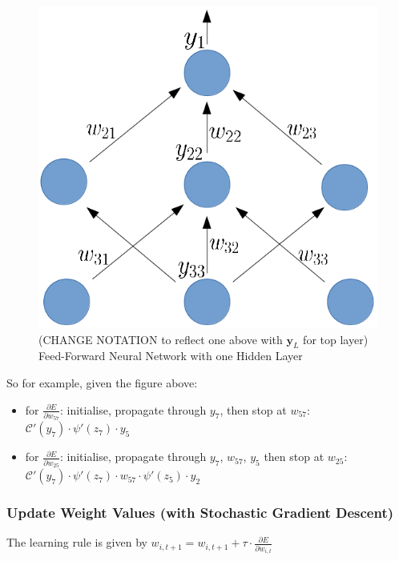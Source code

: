 \documentclass[a4paper,11pt]{article}
\begin{document}
\begin{figure}[h!]
	\centering
	\includegraphics[scale=0.28]{images/gradient_propagates.png}
	\caption{(CHANGE NOTATION to reflect one above with $\textbf{y}_L$ for top layer) Feed-Forward Neural Network with one Hidden Layer}
\end{figure}

So for example, given the figure above:
\begin{itemize}
\renewcommand\labelitemi{--}
\item for $\frac{\partial{E}}{\partial{w_{57}}}$: initialise, propagate through $y_{7}$, then stop at $w_{57}$:
 $ \mathcal{C}'(y_{7}) \cdot \psi'(z_7) \cdot y_5$ 
\item for $\frac{\partial{E}}{\partial{w_{25}}}$: initialise, propagate through $y_{7}$, $w_{57}$, $y_{5}$ then stop at $w_{25}$:
 $\mathcal{C}'(y_{7}) \cdot \psi'(z_7) \cdot w_{57} \cdot \psi'(z_5) \cdot y_2$ \\
\end{itemize}


\subsubsection{Update Weight Values (with Stochastic Gradient Descent)}

The learning rule is given by $w_{i,t+1} = w_{i,t+1} + \tau \cdot \frac{\partial{E}}{\partial{w_{i,t}}}$
\end{document}
